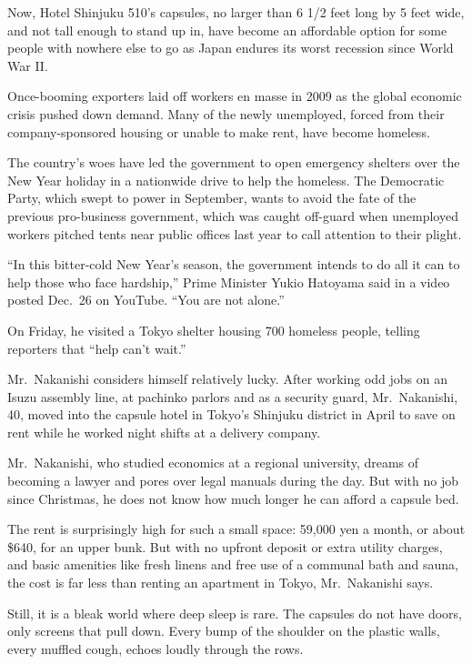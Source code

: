 ﻿\documentclass[12pt]{article}
\begin{document}
Now, Hotel Shinjuku 510's capsules, no larger than 6 1/2 feet long by 5 feet wide, and not tall
enough to stand up in, have become an affordable option for some people with nowhere else to go as
Japan endures its worst recession since World War II.

Once-booming exporters laid off workers en masse in 2009 as the global economic crisis pushed down
demand. Many of the newly unemployed, forced from their company-sponsored housing or unable to make
rent, have become homeless.

The country's woes have led the government to open emergency shelters over the New Year holiday in a
nationwide drive to help the homeless. The Democratic Party, which swept to power in September,
wants to avoid the fate of the previous pro-business government, which was caught off-guard when
unemployed workers pitched tents near public offices last year to call attention to their plight.

``In this bitter-cold New Year's season, the government intends to do all it can to help those who
face hardship,'' Prime Minister Yukio Hatoyama said in a video posted Dec.~26 on YouTube. ``You are
not alone.''

On Friday, he visited a Tokyo shelter housing 700 homeless people, telling reporters that ``help
can't wait.''

Mr.~Nakanishi considers himself relatively lucky. After working odd jobs on an Isuzu assembly line,
at pachinko parlors and as a security guard, Mr.~Nakanishi, 40, moved into the capsule hotel in
Tokyo's Shinjuku district in April to save on rent while he worked night shifts at a delivery
company.

Mr.~Nakanishi, who studied economics at a regional university, dreams of becoming a lawyer and pores
over legal manuals during the day. But with no job since Christmas, he does not know how much longer
he can afford a capsule bed.

The rent is surprisingly high for such a small space: 59,000 yen a month, or about \$640, for an
upper bunk. But with no upfront deposit or extra utility charges, and basic amenities like fresh
linens and free use of a communal bath and sauna, the cost is far less than renting an apartment in
Tokyo, Mr.~Nakanishi says.

Still, it is a bleak world where deep sleep is rare. The capsules do not have doors, only screens
that pull down. Every bump of the shoulder on the plastic walls, every muffled cough, echoes loudly
through the rows.
\end{document}
